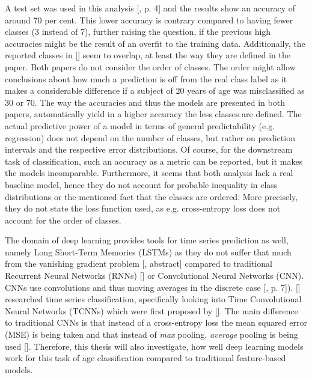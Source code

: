 \documentclass[11pt]{scrartcl}
\begin{document}
A test set was used in this analysis [\cite{threeclassclassification}, p. 4] and the results show an accuracy of around $70$ per cent. This lower accuracy is contrary compared to having fewer classes ($3$ instead of $7$), further raising the question, if the previous high accuracies might be the result of an overfit to the training data. Additionally, the reported classes in [\cite{threeclassclassification}] seem to overlap, at least the way they are defined in the paper. Both papers do not consider the order of classes. The order might allow conclusions about how much a prediction is off from the real class label as it makes a considerable difference if a subject of 20 years of age was misclassified as 30 or 70. The way the accuracies and thus the models are presented in both papers, automatically yield in a higher accuracy the less classes are defined. The actual predictive power of a model in terms of general predictability (e.g. regression) does not depend on the number of classes, but rather on prediction intervals and the respective error distributions. Of course, for the downstream task of classification, such an accuracy as a metric can be reported, but it makes the models incomparable. Furthermore, it seems that both analysis lack a real baseline model, hence they do not account for probable inequality in class distributions or the mentioned fact that the classes are ordered. More precisely, they do not state the loss function used, as e.g. cross-entropy loss does not account for the order of classes.

The domain of deep learning provides tools for time series prediction as well, namely Long Short-Term Memories (LSTMs) as they do not suffer that much from the vanishing gradient problem [\cite{10.1162/neco.1997.9.8.1735}, abstract] compared to traditional Recurrent Neural Networks (RNNs) [\cite{pascanu2012difficulty}] or Convolutional Neural Networks (CNN). CNNs use convolutions and thus moving averages in the discrete case [\cite{dlclassification}, p. 7]). [\cite{dlclassification}] researched time series classification, specifically looking into Time Convolutional Neural Networks (TCNNs) which were first proposed by [\cite{tcnn}]. The main difference to traditional CNNs is that instead of a cross-entropy loss the mean squared error (MSE) is being taken and that instead of \textit{max} pooling, \textit{average} pooling is being used [\cite{dlclassification}]. Therefore, this thesis will also investigate, how well deep learning models work for this task of age classification compared to traditional feature-based models.
\end{document}
